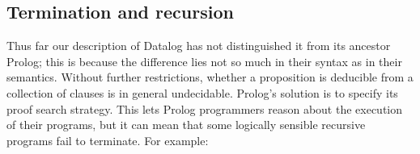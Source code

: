 



\subsection{Termination and recursion}

Thus far our description of Datalog has not distinguished it from its ancestor
Prolog; this is because the difference lies not so much in their syntax as in
their semantics.
%
Without further restrictions, whether a proposition is deducible from a
collection of clauses is in general undecidable.
%
Prolog's solution is to specify its proof search strategy.
%
This lets Prolog programmers reason about the execution of their programs, but
it can mean that some logically sensible recursive programs fail to terminate.
%
For example:

